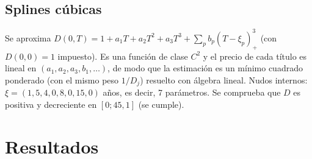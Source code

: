 \documentclass[a4paper,12pt]{article}
\begin{document}
\subsection{Splines cúbicas}
Se aproxima $D(0,T)=1+a_1T+a_2T^2+a_3T^3+\sum_{p}b_p(T-\xi_p)_+^3$ (con $D(0,0)=1$ impuesto). Es una función de clase $C^2$ y el precio de cada título es lineal en $(a_1,a_2,a_3,b_1,\dots)$, de modo que la estimación es un mínimo cuadrado ponderado (con el mismo peso $1/D_j$) resuelto con álgebra lineal. Nudos internos: $\xi=(1{,}5, 4{,}0, 8{,}0, 15{,}0)$ años, es decir, 7 parámetros. Se comprueba que $D$ es positiva y decreciente en $[0;45{,}1]$ (se cumple).

\section{Resultados}
\end{document}
